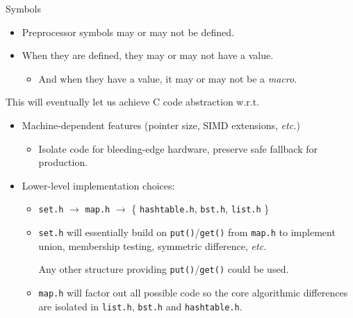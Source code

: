 \begin{frame}[fragile]{Symbols}
  
  \begin{itemize}
  \item Preprocessor symbols may or may not be defined.
  \item When they are defined, they may or may not have a value.
    \begin{itemize}
    \item And when they have a value, it may or may not be a {\em macro}.
    \end{itemize}
  \end{itemize}

  This will eventually let us achieve C code abstraction w.r.t.
  \begin{itemize}
  \item Machine-dependent features (pointer size, SIMD extensions, {\em etc.})
    \begin{itemize}
    \item Isolate code for bleeding-edge hardware, preserve safe fallback for production.
    \end{itemize}
  \item Lower-level implementation choices:
    \begin{itemize}
    \item \lstinline{set.h} $\rightarrow$ \lstinline{map.h} $\rightarrow$ \{ \lstinline{hashtable.h}, \lstinline{bst.h}, \lstinline{list.h} \}
    \item \lstinline{set.h} will essentially build on \lstinline{put()}/\lstinline{get()} from \lstinline{map.h} to implement union, membership testing, symmetric difference, {\em etc.}

      Any other structure providing \lstinline{put()}/\lstinline{get()} could be used.
    \item \lstinline{map.h} will factor out all possible code so the core algorithmic differences are isolated in \lstinline{list.h}, \lstinline{bst.h} and \lstinline{hashtable.h}.
    \end{itemize}
  \end{itemize}

\end{frame}

